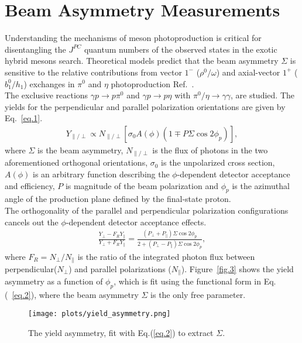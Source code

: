 \documentclass[a4paper]{jpconf}
\begin{document}
\section{Beam Asymmetry Measurements}
Understanding the mechanisms of meson photoproduction is critical for disentangling the $J^{PC}$ quantum numbers of the observed states in the exotic hybrid mesons search. Theoretical models predict that the beam asymmetry $\Sigma$ is sensitive to the relative contributions from vector $1^{-}$ ($\rho^{0}/\omega$) and axial-vector $1^{+}$ ($b_{1}^{0}/h_{1}$) exchanges in $\pi^{0}$ and $\eta$ photoproduction Ref.~\cite{ref.4}.\\
The exclusive reactions $\gamma p \rightarrow p \pi^{0}$ and $\gamma p \rightarrow p \eta$ with $\pi^{0}/\eta\rightarrow \gamma\gamma$, are studied. The yields for the perpendicular and parallel polarization orientations are given by Eq.~\ref{eq.1}. 
\begin{align}
Y_{\parallel/\perp} \propto N_{\parallel/\perp}[\sigma_{0}A(\phi)(1 \mp P \Sigma \cos 2\phi_{p})],
\label{eq.1}
\end{align}
where $\Sigma$ is the beam asymmetry, $N_{\parallel/\perp}$ is the flux of photons in the two aforementioned orthogonal orientations, $\sigma_{0}$ is the unpolarized cross section, $A(\phi)$ is an arbitrary function describing the $\phi$-dependent detector acceptance and efficiency, $P$ is magnitude of the beam polarization and $\phi_{p}$ is the azimuthal angle of the production plane defined by the final-state proton.\\
The orthogonality of the parallel and perpendicular polarization configurations cancels out the $\phi$-dependent detector acceptance effects.
\begin{align}
\frac{Y_{\perp}-F_{R}Y_{\parallel}}{Y_{\perp}+F_{R}Y_{\parallel}} = \frac{(P_{\perp}+P_{\parallel})\Sigma \cos 2\phi_{p}}{2+(P_{\perp}-P_{\parallel})\Sigma \cos 2\phi_{p}},
\label{eq.2}
\end{align}
where $F_{R} = N_{\perp}/N_{\parallel}$ is the ratio of the integrated photon flux between perpendicular($N_{\perp}$) and parallel polarizations ($N_{\parallel}$). Figure~\ref{fig.3} shows the yield asymmetry as a function of $\phi_{p}$, which is fit using the functional form in Eq.(~\ref{eq.2}), where the beam asymmetry $\Sigma$ is the only free parameter.

\begin{figure}[h]
    \centering
    \texttt{[image: plots/yield\_asymmetry.png]}
    \caption{\label{fig.2}The yield asymmetry, fit with Eq.(\ref{eq.2}) to extract $\Sigma$.}
\end{figure}
\end{document}

